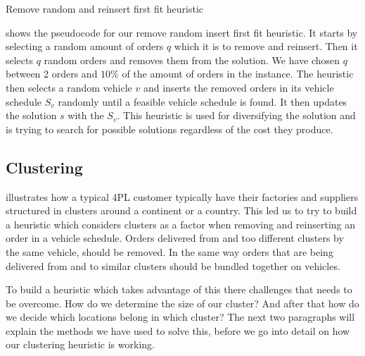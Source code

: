 \documentclass[../main.tex]{subfiles}
\begin{document}
\begin{algorithm}
    \caption{Remove random and reinsert first fit heuristic}\label{alg:rand}
    \begin{algorithmic}[1]
        $}
        \State select the number of orders to reinsert $q$
        \State solution $s' = s$
        \State remove $q$ orders from $s'$
        \State set I = removed orders
        \For{$z\in I$}
            \Repeat
            \State choose random vehicle $v$
            \State choose random position in vehicle schedule $S_v$
            \State insert $z$ in $S_v$
            \Until {feasible vehicle schedule found}
            \State update s'
        \EndFor
        \State
        \Return s'
        \EndFunction
    \end{algorithmic}
\end{algorithm}

 shows the pseudocode for our remove random insert first fit heuristic. 
It starts by selecting a random amount of orders $q$ which it is to remove and reinsert. 
Then it selects $q$ random orders and removes them from the solution. 
We have chosen $q$ between 2 orders and $10\%$ of the amount of orders in the instance.
The heuristic then selects a random vehicle $v$ and inserts the removed orders in its vehicle schedule $S_v$ randomly until a feasible vehicle schedule is found.
It then updates the solution $s$ with the $S_v$.
This heuristic is used for diversifying the solution and is trying to search for possible solutions regardless of the cost they produce.

\subsection{Clustering}
\label{sec:clust}
 illustrates how a typical 4PL customer typically have their factories and suppliers structured in clusters around a continent or a country. 
This led us to try to build a heuristic which considers clusters as a factor when removing and reinserting an order in a vehicle schedule. 
Orders delivered from and too different clusters by the same vehicle, should be removed. 
In the same way orders that are being delivered from and to similar clusters should be bundled together on vehicles. \par
To build a heuristic which takes advantage of this there challenges that needs to be overcome. 
How do we determine the size of our cluster? 
And after that how do we decide which locations belong in which cluster? 
The next two paragraphs will explain the methods we have used to solve this, before we go into detail on how our clustering heuristic is working.
\end{document}
